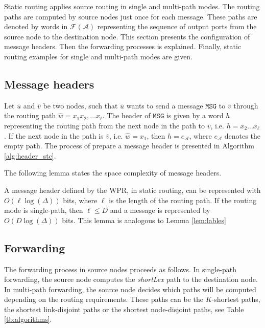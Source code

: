 \label{sec:static}

Static routing applies source routing in single and multi-path modes. The routing paths are computed by source nodes just once for each message. These paths are denoted by words in $\mathcal{F}(\mathcal{A})$ representing the sequence of output ports from the source node to the destination node.
This section presents the configuration of message headers. Then the forwarding processes is explained. Finally, static routing examples for single and multi-path modes are given.

\subsection{Message headers}

Let $\overline{u}$ and $\overline{v}$ be two nodes, such that $\overline{u}$ wants to send a message $\mathtt{MSG}$ to $\overline{v}$ through the routing path $\widehat{w}=x_1x_2,\ldots x_\ell$. The header of $\mathtt{MSG}$ is given by a word $h$ representing the routing path from the next node in the path to $\overline{v}$, i.e. $h=x_2\ldots x_\ell$.
If the next node in the path is $\overline{v}$, i.e. $\widehat{w}=x_1$, then $h=e_\mathcal{A}$, where $e_\mathcal{A}$ denotes the empty path. The process of prepare a message header is presented in Algorithm \ref{alg:header_stc}.



The following lemma states the space complexity of message headers.
\begin{lemma}
\label{lem:header_size_det}
A message header defined by the WPR, in static routing, can be represented with $O(\ell\log{(\Delta)})$ bits, where $\ell$ is the length of the routing path. If the routing mode is single-path, then $\ell \leq D$ and a message is represented by $O(D\log{(\Delta)})$ bits. 
This lemma is analogous to Lemma \ref{lem:lables}
\end{lemma}

\subsection{Forwarding}

The forwarding process in source nodes proceeds as follows. In single-path forwarding, the source node computes the \textit{shortLex} path to the destination node. In multi-path forwarding, the source node decides which paths will be computed depending on the routing requirements. These paths can be 
the $K$-shortest paths, the shortest link-disjoint paths or the shortest node-disjoint paths, see Table \ref{tb:algorithms}. 

